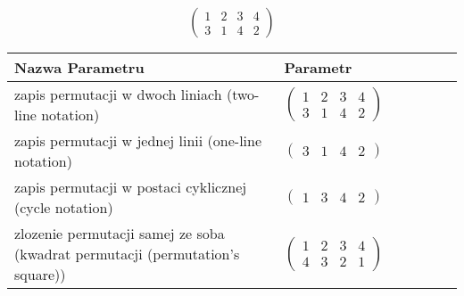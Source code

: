 \documentclass[12pt]{article}
\begin{document}
\subsection{}
\begin{center}
\[
\begin{pmatrix}
	1 & 2 & 3 & 4 \\ 
	3 & 1 & 4 & 2 
\end{pmatrix}
\]

\begin{tabular}{|m{0.6\linewidth}|m{0.4\linewidth}|}
	\hline
	Nazwa Parametru & Parametr \\
	\hline
	zapis permutacji w dwoch liniach (two-line notation) & $\begin{pmatrix} 1 & 2 & 3 & 4 \\ 
3 & 1 & 4 & 2 \end{pmatrix}$ \\ 
	\hline
	zapis permutacji w jednej linii (one-line notation) & $\begin{pmatrix} 3 & 1 & 4 & 2 \end{pmatrix}$ \\ 
	\hline
	zapis permutacji w postaci cyklicznej (cycle notation) & $\begin{pmatrix} 1 & 3 & 4 & 2 \end{pmatrix} $ \\ 
	\hline
	zlozenie permutacji samej ze soba (kwadrat permutacji (permutation's square)) & $\begin{pmatrix} 1 & 2 & 3 & 4 \\ 
4 & 3 & 2 & 1 \end{pmatrix}$ \\ 
	\hline
\end{tabular}
\end{center}
\end{document}
